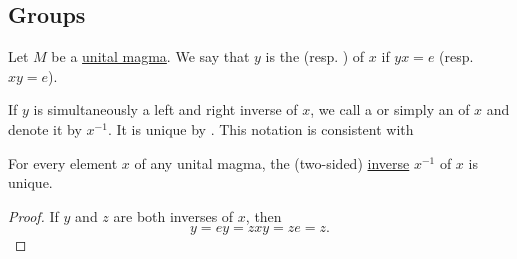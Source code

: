 \subsection{Groups}\label{subsec:groups}

\begin{definition}\label{def:unital_magma_inverse_element}
  Let \( M \) be a \hyperref[def:unital_magma]{unital magma}. We say that \( y \) is the  (resp. ) of \( x \) if \( yx = e \) (resp. \( xy = e \)).

  If \( y \) is simultaneously a left and right inverse of \( x \), we call a  or simply an  of \( x \) and denote it by \( x^{-1} \). It is unique by . This notation is consistent with 
\end{definition}

\begin{proposition}\label{def:unital_magma_inverse_element_unique}
  For every element \( x \) of any unital magma, the (two-sided) \hyperref[def:unital_magma_inverse_element]{inverse} \( x^{-1} \) of \( x \) is unique.
\end{proposition}
\begin{proof}
  If \( y \) and \( z \) are both inverses of \( x \), then
  \begin{equation*}
    y = ey = zxy = ze = z.
  \end{equation*}
\end{proof}

